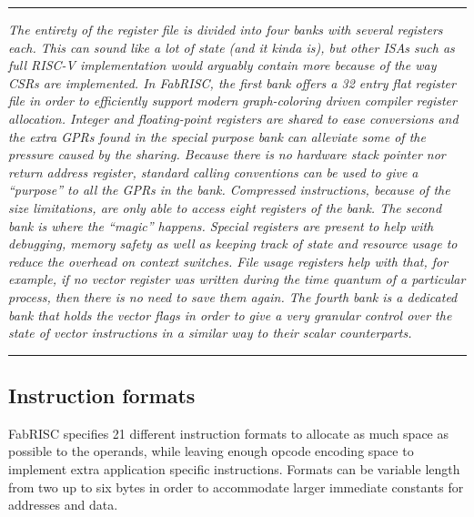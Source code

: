 \documentclass{article}
\begin{document}
        \par\noindent\rule{\textwidth}{0.4pt}
        \textit{The entirety of the register file is divided into four banks with several registers each. This can sound like a lot of state (and it kinda is), but other ISAs such as full RISC-V implementation would arguably contain more because of the way CSRs are implemented. In FabRISC, the first bank offers a 32 entry flat register file in order to efficiently support modern graph-coloring driven compiler register allocation. Integer and floating-point registers are shared to ease conversions and the extra GPRs found in the special purpose bank can alleviate some of the pressure caused by the sharing. Because there is no hardware stack pointer nor return address register, standard calling conventions can be used to give a ``purpose'' to all the GPRs in the bank. Compressed instructions, because of the size limitations, are only able to access eight registers of the bank. The second bank is where the ``magic'' happens. Special registers are present to help with debugging, memory safety as well as keeping track of state and resource usage to reduce the overhead on context switches. File usage registers help with that, for example, if no vector register was written during the time quantum of a particular process, then there is no need to save them again. The fourth bank is a dedicated bank that holds the vector flags in order to give a very granular control over the state of vector instructions in a similar way to their scalar counterparts.}
        \par\noindent\rule{\textwidth}{0.4pt}

        \subsection{Instruction formats}

            FabRISC specifies 21 different instruction formats to allocate as much space as possible to the operands, while leaving enough opcode encoding space to implement extra application specific instructions. Formats can be variable length from two up to six bytes in order to accommodate larger immediate constants for addresses and data.

            \vspace{10pt}
            
            \vspace{10pt}
            
            \vspace{10pt}
            
            \vspace{10pt}
\end{document}
